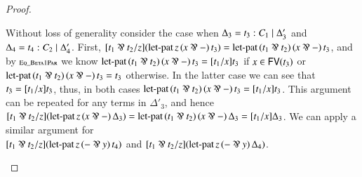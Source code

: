 \documentclass{elsarticle}
\renewcommand{\FILLdrulename}[1]{\scriptsize \textsc{#1}}
\begin{document}
\begin{proof}
\begin{report}
\begin{itemize}
Without loss of generality consider the case when
$\Delta_{{\mathrm{3}}} =  \mathit{t_{{\mathrm{3}}}}  :  \mathit{C_{{\mathrm{1}}}}  \mid  \Delta'_{{\mathrm{3}}} $ and $\Delta_{{\mathrm{4}}} =  \mathit{t_{{\mathrm{4}}}}  :  \mathit{C_{{\mathrm{2}}}}  \mid  \Delta'_{{\mathrm{4}}} $.  First,
$\FILLsym{[}   \FILLnt{t_{{\mathrm{1}}}}  \parr  \FILLnt{t_{{\mathrm{2}}}}   \FILLsym{/}  \FILLmv{z}  \FILLsym{]}   (  \mathsf{\operatorname{let-pat} }\, \FILLmv{z} \, \FILLsym{(}   \FILLmv{x}  \parr   -    \FILLsym{)} \, \FILLnt{t_{{\mathrm{3}}}}  )   \FILLsym{=}   \mathsf{\operatorname{let-pat} }\,  (  \FILLnt{t_{{\mathrm{1}}}}  \parr  \FILLnt{t_{{\mathrm{2}}}}  )  \, \FILLsym{(}   \FILLmv{x}  \parr   -    \FILLsym{)} \, \FILLnt{t_{{\mathrm{3}}}} $,
and by $\FILLdrulename{Eq\_Beta1Par}$ we know
$ \mathsf{\operatorname{let-pat} }\,  (  \FILLnt{t_{{\mathrm{1}}}}  \parr  \FILLnt{t_{{\mathrm{2}}}}  )  \, \FILLsym{(}   \FILLmv{x}  \parr   -    \FILLsym{)} \, \FILLnt{t_{{\mathrm{3}}}}   \FILLsym{=}  \FILLsym{[}  \FILLnt{t_{{\mathrm{1}}}}  \FILLsym{/}  \FILLmv{x}  \FILLsym{]}  \FILLnt{t_{{\mathrm{3}}}}$ if $ \mathit{x}  \in \mathsf{FV}(  \mathit{t_{{\mathrm{3}}}}  ) $
or $ \mathsf{\operatorname{let-pat} }\,  (  \FILLnt{t_{{\mathrm{1}}}}  \parr  \FILLnt{t_{{\mathrm{2}}}}  )  \, \FILLsym{(}   \FILLmv{x}  \parr   -    \FILLsym{)} \, \FILLnt{t_{{\mathrm{3}}}}   \FILLsym{=}  \FILLnt{t_{{\mathrm{3}}}}$ otherwise.  In the
latter case we can see that $\mathit{t_{{\mathrm{3}}}}  =  [  \mathit{t_{{\mathrm{1}}}}  /  \mathit{x}  ]  \mathit{t_{{\mathrm{3}}}}$, thus, in both cases
$ \mathsf{\operatorname{let-pat} }\,  (  \FILLnt{t_{{\mathrm{1}}}}  \parr  \FILLnt{t_{{\mathrm{2}}}}  )  \, \FILLsym{(}   \FILLmv{x}  \parr   -    \FILLsym{)} \, \FILLnt{t_{{\mathrm{3}}}}   \FILLsym{=}  \FILLsym{[}  \FILLnt{t_{{\mathrm{1}}}}  \FILLsym{/}  \FILLmv{x}  \FILLsym{]}  \FILLnt{t_{{\mathrm{3}}}}$.  This argument can
be repeated for any terms in $\Delta'_{{\mathrm{3}}}$, and hence
$\FILLsym{[}   \FILLnt{t_{{\mathrm{1}}}}  \parr  \FILLnt{t_{{\mathrm{2}}}}   \FILLsym{/}  \FILLmv{z}  \FILLsym{]}  \FILLsym{(}   \mathsf{\operatorname{let-pat} }\, \FILLmv{z} \, \FILLsym{(}   \FILLmv{x}  \parr   -    \FILLsym{)} \, \Delta_{{\mathrm{3}}}   \FILLsym{)} =  \mathsf{\operatorname{let-pat} }\,  (  \FILLnt{t_{{\mathrm{1}}}}  \parr  \FILLnt{t_{{\mathrm{2}}}}  )  \, \FILLsym{(}   \FILLmv{x}  \parr   -    \FILLsym{)} \, \Delta_{{\mathrm{3}}}   \FILLsym{=}  \FILLsym{[}  \FILLnt{t_{{\mathrm{1}}}}  \FILLsym{/}  \FILLmv{x}  \FILLsym{]}  \Delta_{{\mathrm{3}}}$.
We can apply a similar argument for\\
$\FILLsym{[}   \FILLnt{t_{{\mathrm{1}}}}  \parr  \FILLnt{t_{{\mathrm{2}}}}   \FILLsym{/}  \FILLmv{z}  \FILLsym{]}   (  \mathsf{\operatorname{let-pat} }\, \FILLmv{z} \, \FILLsym{(}    -   \parr  \FILLmv{y}   \FILLsym{)} \, \FILLnt{t_{{\mathrm{4}}}}  ) $ and
$\FILLsym{[}   \FILLnt{t_{{\mathrm{1}}}}  \parr  \FILLnt{t_{{\mathrm{2}}}}   \FILLsym{/}  \FILLmv{z}  \FILLsym{]}  \FILLsym{(}   \mathsf{\operatorname{let-pat} }\, \FILLmv{z} \, \FILLsym{(}    -   \parr  \FILLmv{y}   \FILLsym{)} \, \Delta_{{\mathrm{4}}}   \FILLsym{)}$.



\end{itemize}
\end{report}
\end{proof}
\end{document}
